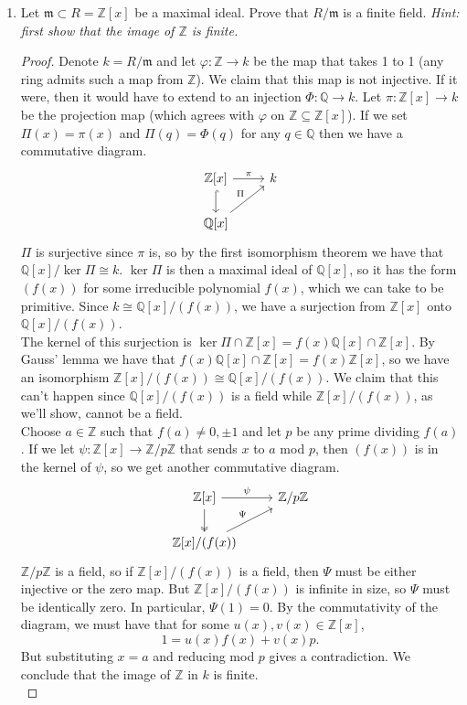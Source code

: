 \documentclass[11pt,letterpaper]{report}
\newcommand{\integers}{\mathbb{Z}}
\newcommand{\rationals}{\mathbb{Q}}
\begin{document}
\begin{enumerate}
	\item Let $\mathfrak{m}\subset R = \integers[x]$ be a maximal ideal. Prove that $R/\mathfrak{m}$ is a finite field. \textit{Hint: first show that the image of $\integers$ is finite.}
	\begin{proof}
		Denote $k = R/\mathfrak{m}$ and let $\varphi: \integers \to k$ be the map that takes 1 to 1 (any ring admits such a map from $\integers$). We claim that this map is not injective. If it were, then it would have to extend to an injection $\Phi: \rationals \to k$. Let $\pi: \integers[x]\to k$ be the projection map (which agrees with $\varphi$ on $\integers\subseteq \integers[x]$). If we set $\Pi(x) = \pi(x)$ and $\Pi(q) = \Phi(q)$ for any $q\in \rationals$ then we have a commutative diagram.
		\[
		\begin{tikzcd}
			\integers[x]\arrow[r, "\pi"]\arrow[d, hook] & k\\
			\rationals[x]\arrow[ur, "\Pi"]
		\end{tikzcd}
		\]
		$\Pi$ is surjective since $\pi$ is, so by the first isomorphism theorem we have that $\rationals[x]/\ker \Pi \cong k$. $\ker\Pi$ is then a maximal ideal of $\rationals[x]$, so it has the form $(f(x))$ for some irreducible polynomial $f(x)$, which we can take to be primitive. Since $k\cong \rationals[x]/(f(x))$, we have a surjection from $\integers[x]$ onto $\rationals[x]/(f(x))$.\\

		\noindent The kernel of this surjection is $\ker \Pi \cap \integers[x] = f(x)\rationals[x]\cap \integers[x]$. By Gauss' lemma we have that $f(x)\rationals[x]\cap \integers[x] = f(x)\integers[x]$, so we have an isomorphism $\integers[x]/(f(x))\cong \rationals[x]/(f(x))$. We claim that this can't happen since $\rationals[x]/(f(x))$ is a field while $\integers[x]/(f(x))$, as we'll show, cannot be a field.\\

		\noindent Choose $a\in \integers$ such that $f(a) \neq 0, \pm 1$ and let $p$ be any prime dividing $f(a)$. If we let $\psi: \integers[x]\to \integers/p\integers$ that sends $x$ to $a$ mod $p$, then $(f(x))$ is in the kernel of $\psi$, so we get another commutative diagram.
		\[
		\begin{tikzcd}
			\integers[x]\arrow[r, "\psi"]\arrow[d, twoheadrightarrow] & \integers/p\integers\\
			\integers[x]/(f(x))\arrow[ur, "\Psi"]
		\end{tikzcd}
		\]
		$\integers/p\integers$ is a field, so if $\integers[x]/(f(x))$ is a field, then $\Psi$ must be either injective or the zero map. But $\integers[x]/(f(x))$ is infinite in size, so $\Psi$ must be identically zero. In particular, $\Psi(1) = 0$. By the commutativity of the diagram, we must have that for some $u(x), v(x)\in \integers[x]$,
		\[
		1 = u(x)f(x) + v(x)p.
		\]
		But substituting $x = a$ and reducing mod $p$ gives a contradiction. We conclude that the image of $\integers$ in $k$ is finite.\\


\end{proof}
\end{enumerate}
\end{document}
